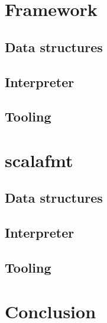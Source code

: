 \documentclass[11pt,a4paper]{article}
\begin{document}



\tableofcontents

\section{Framework}
\subsection{Data structures}
\subsection{Interpreter}
\subsection{Tooling}
\section{scalafmt}
\subsection{Data structures}
\subsection{Interpreter}
\subsection{Tooling}
\section{Conclusion}
\printbibliography{}
\end{document}
